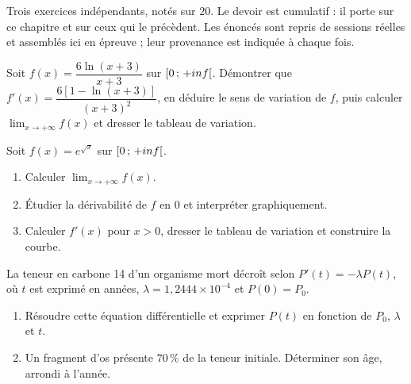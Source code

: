 \begin{devoir}[2 heures]
Trois exercices indépendants, notés sur $20$. Le devoir est cumulatif : il porte sur ce chapitre et sur ceux qui le précèdent. Les énoncés sont repris de sessions réelles et assemblés ici en épreuve ; leur provenance est indiquée à chaque fois.

Soit $f(x) = \dfrac{6\ln(x+3)}{x+3}$ sur $\left[0\,;\,+inf\right[$.
Démontrer que $f'(x) = \dfrac{6\left[1-\ln(x+3)\right]}{(x+3)^{2}}$, en
déduire le sens de variation de $f$, puis calculer
$\lim_{x\to+\infty}f(x)$ et dresser le tableau de variation.

Soit $f(x) = e^{\sqrt x}$ sur $\left[0\,;\,+inf\right[$.
\begin{enumerate}[label=\textbf{\alph*)}, leftmargin=*, itemsep=0.15em]
  \item Calculer $\lim_{x\to+\infty}f(x)$.
  \item Étudier la dérivabilité de $f$ en $0$ et interpréter graphiquement.
  \item Calculer $f'(x)$ pour $x>0$, dresser le tableau de variation et
        construire la courbe.
\end{enumerate}

La teneur en carbone 14 d'un organisme mort décroît selon
$P'(t) = -\lambda P(t)$, où $t$ est exprimé en années,
$\lambda = 1{,}2444\times10^{-4}$ et $P(0) = P_{0}$.
\begin{enumerate}[label=\textbf{\alph*)}, leftmargin=*, itemsep=0.15em]
  \item Résoudre cette équation différentielle et exprimer $P(t)$ en fonction
        de $P_{0}$, $\lambda$ et $t$.
  \item Un fragment d'os présente $70\,\%$ de la teneur initiale. Déterminer
        son âge, arrondi à l'année.
\end{enumerate}

\end{devoir}


